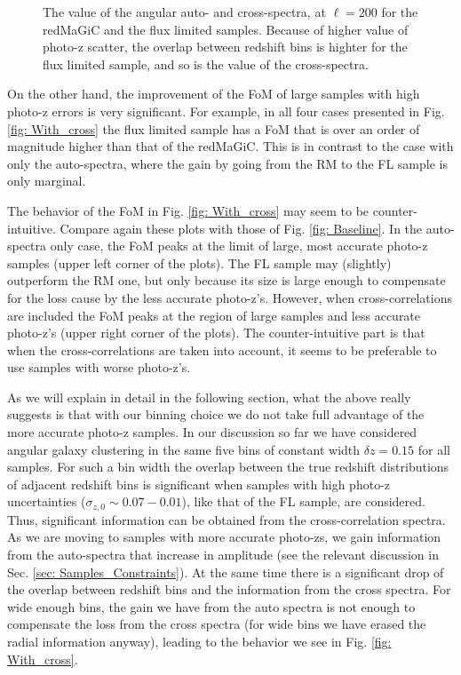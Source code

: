 \documentclass[a4paper,fleqn,usenatbib]{mnras}
\begin{document}
\begin{figure}
\centering
{}

\caption{The value of the angular auto- and cross-spectra, at $\ell =200$ for the redMaGiC and the flux limited samples. Because of higher value of photo-z scatter, the overlap between redshift bins is highter for the flux limited sample, and so is the value of the cross-spectra.}
\label{fig: Importance}
\end{figure}

On the other hand, the improvement of the FoM of large samples with high photo-z errors is very significant. For example, in all four cases presented in Fig. \ref{fig: With_cross}  the flux limited sample has a FoM that is over an order of magnitude higher than that of the redMaGiC. This is in contrast to the case with only the auto-spectra, where the gain by going from the RM to the FL sample is only marginal.

The behavior of the FoM in Fig. \ref{fig: With_cross} may seem to be counter-intuitive. Compare again these plots with those of Fig. \ref{fig: Baseline}. In the auto-spectra only case, the FoM peaks at the limit of large, most accurate photo-z samples (upper left corner of the plots). The FL sample may (slightly) outperform the RM one, but only because its size is large enough to compensate for the loss cause by the less accurate photo-z's. However, when cross-correlations are included the FoM peaks at the region of large samples and less accurate photo-z's (upper right corner of the plots). The counter-intuitive part is that when the cross-correlations are taken into account, it seems to be preferable to use  samples with worse photo-z's.

As we will explain in detail in the following section, what the above really suggests is that with our binning choice we do not take full advantage of the more accurate photo-z samples. In our discussion so far we have considered angular galaxy clustering in the same five bins of constant width $\delta z = 0.15$ for all samples. For such a bin width the overlap between the true redshift distributions of adjacent  redshift bins is significant when samples with high photo-z uncertainties ($\sigma_{z,0} \sim 0.07-0.01$), like that of the FL sample, are considered. Thus, significant information can be  obtained from the cross-correlation spectra. As we are moving to samples with more accurate photo-zs, we gain information from the auto-spectra that increase in amplitude (see the relevant discussion in Sec. \ref{sec: Samples_Constraints}). At the same time there is a significant drop of the overlap between redshift bins and the information from the cross spectra. For wide enough bins, the gain we have from the auto spectra is not enough to compensate the loss from the cross spectra (for wide bins we have erased the radial information anyway), leading to the behavior we see in Fig. \ref{fig: With_cross}.
\end{document}
